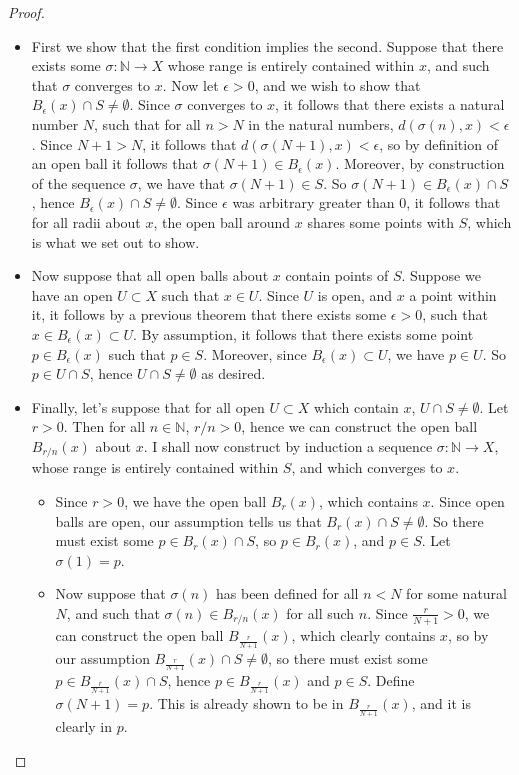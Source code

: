 \documentclass[11pt]{article}
\newcommand{\N}{\mathbb{N}}
\theoremstyle{definition}
\begin{document}
\begin{proof}

\begin{itemize}
\item First we show that the first condition implies the second. Suppose that there exists some $\sigma:\N\to X$ whose range is entirely contained within $x$, and such that $\sigma$ converges to $x$. Now let $\epsilon> 0$, and we wish to show that $ B_\epsilon(x) \cap S \ne \emptyset $. Since $\sigma$ converges to $x$, it follows that there exists a natural number $N$, such that for all $n>N$ in the natural numbers, $d(\sigma(n), x ) < \epsilon$. Since $N+1 > N$, it follows that $d(\sigma(N+1) , x) < \epsilon$, so by definition of an open ball it follows that $\sigma(N+1)\in B_\epsilon(x)$. Moreover, by construction of the sequence $\sigma$, we have that $\sigma(N+1)\in S$. So $\sigma(N+1)\in B_\epsilon(x) \cap S$, hence $B_\epsilon(x)\cap S \ne \emptyset$. Since $\epsilon $ was arbitrary greater than $0$, it follows that for all radii about $x$, the open ball around $x$ shares some points with $S$, which is what we set out to show.

\item Now suppose that all open balls about $x$ contain points of $S$. Suppose we have an open $U\subset X$ such that $x\in U$. Since $U$ is open, and $x$ a point within it, it follows by a previous theorem that there exists some $\epsilon > 0$, such that $x\in B_\epsilon(x)\subset U$. By assumption, it follows that there exists some point $p\in B_\epsilon(x)$ such that $p\in S$. Moreover, since $B_\epsilon(x)\subset U$, we have $p\in U$. So $p\in U\cap S$, hence $U\cap S\ne \emptyset$ as desired.

\item Finally, let's suppose that for all open $U\subset X$ which contain $x$, $U\cap S\ne \emptyset$. Let $r>0$. Then for all $n\in \N$, $r/n > 0$, hence we can construct the open ball $B_{r/n}(x)$ about $x$. I shall now construct by induction a sequence $\sigma:\N\to X$, whose range is entirely contained within $S$, and which converges to $x$. 

\begin{itemize}
\item Since $r>0$, we have the open ball $B_r(x)$, which contains $x$. Since open balls are open, our assumption tells us that $B_r(x) \cap S\ne \emptyset$. So there must exist some $p\in B_r(x)\cap S$, so $p\in B_r(x)$, and $p\in S$. Let $\sigma(1) = p$.
\item Now suppose that $\sigma(n)$ has been defined for all $n < N$ for some natural $N$, and such that $\sigma(n) \in B_{r/n}(x)$ for all such $n$. Since $\frac{r}{N+1}> 0$, we can construct the open ball $ B_{\frac{r}{N+1}}(x) $, which clearly contains $x$, so by our assumption $B_{\frac{r}{N+1}}(x)\cap S \ne \emptyset$, so there must exist some $p\in B_{\frac{r}{N+1}}(x)\cap S$, hence $p\in B_{\frac{r}{N+1}}(x)$ and $p\in S$. Define $\sigma(N+1) = p$. This is already shown to be in $B_{\frac{r}{N+1}}(x)$, and it is clearly in $p$.


\end{itemize}
\end{itemize}
\end{proof}
\end{document}
